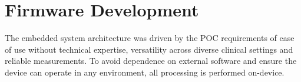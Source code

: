 


\section{Firmware Development}
The embedded system architecture was driven by the \ac{POC} requirements of ease of use without technical expertise, versatility across diverse clinical settings and reliable measurements. To avoid dependence on external software and ensure the device can operate in any environment, all processing is performed on-device. 

